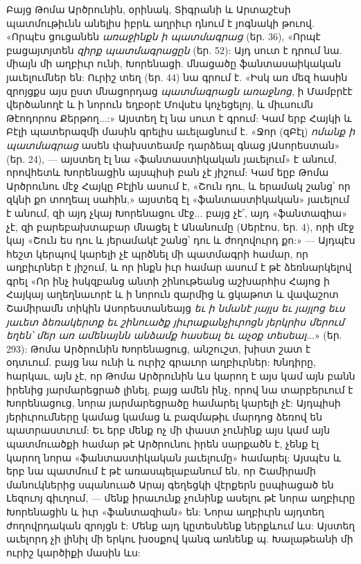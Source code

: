 \documentclass{article}
\begin{document}
{Բայց Թոմա Արծրունին, օրինակ, Տիգրանի և Արտաշէսի պատմութիւնն անելիս իբրև աղրիւր դնում է յոգնակի թուով. «Որպէս ցուցանեն \emph{առաջինքն ի պատմագրաց} (եր. 36), «Որպէ բացայտյտեն \emph{զիրք պատմագրացըն} (եր. 52): Այդ սուտ է դրում նա. միայն մի աղբիւր ունի, Խորենացի. մնացածը ֆանտասաիկական յաւելումներ են: Ուրիշ տեղ (եր. 44) նա գրում է. «Իսկ առ մեզ հասին զրոյցքս այս ըստ մնացորդաց \emph{պատմագրացն առաջնոց}, ի Մամբրէէ վերծանողէ և ի նորուն եղբօրէ Մովսէս կոչեցելոյ, և միւսումն Թէոդորոս Քերթող...:» Այստեղ էլ նա սուտ է գրում: Կամ երբ Հայկի և Բէլի պատերազմի մասին գրելիս աւելացնում է. «Ջոր (զԲէլ) \emph{ոմանք ի պատմագրաց} ասեն փախստեամբ դարձեալ գնաց յԱսորեստան» (եր. 24), — այստեղ էլ նա «ֆանտաստիկական յաւելում» է անում, որովհետև Խորենացին այսպիսի բան չէ յիշում: Կամ եըբ Թոմա Արծրունու մէջ Հայկը Բէլին ասում է, «Շուն դու, և երամակ շանց՝ որ զկնի քո տողեալ սահին,» այստեզ էլ «ֆանտաստիկական» յաւելում է անում, զի այդ չկայ Խորենացու մէջ... բայց չէ՛, այդ «ֆանտազիա» չէ, զի բարեբախտաբար մնացել է Անանումը (Սերէոս, եր. 4), որի մէջ կայ «Շուն ես դու և յերամակէ շանց՝ դու և ժողովուրդ քո:» — Այդպէս հեշտ կերպով կարելի չէ պրծնել մի պատմագրի համար, որ աղբիւրներ է յիշում, և որ ինքն իւր համար ասում է թէ ձեռնարկելով գրել «Որ ինչ իսկզբանց անտի շինութեանց աշխարհիս Հայոց ի Հայկայ աղեղնաւորէ և ի նորուն զարմից և ցկաթոտ և վավաշոտ Շամիրամն տիկին Ասորեստանեայց \emph{եւ ի նմանէ յայլս եւ յայլոց եւս յաւետ ձեռակերտք եւ շինուածք յիւրաքանչիւրոցն յերկրիս մերում եղեն՝ մեր առ ամենայնն անձամք հասեալ եւ աչօք տեսեալ}...» (եր. 293): Թոմա Արծրունին Խորենացուց, անշուշտ, խիստ շատ է օդտւում. բայց նա ունի և ուրիշ գրաւոր աղբիւրներ: Խնդիրը, հարկաւ, այն չէ, որ Թոմա Արծրունին ևս կարող է այս կամ այն բանն իրենից յարմարեցրած լինել, բայց ամեն ինչ, որով նա տարբերւում է Խորենացուց, նորա յարմարեցրածը համարել կարելի չէ: Այդպիսի յերիւրումները կամաց կամաց և բազմաթիւ մարդոց ձեռով են պատրաստւում: Եւ երբ մենք ոչ մի փաստ չունինք այս կամ այն պատմուածքի համար թէ Արծրունու իրեն սարքածն է, չենք էլ կարող նորա «ֆանտաստիկական յաւելումը» համարել: Այսպէս և երբ նա պատմում է թէ առասպելաբանում են, որ Շամիրամի մանուկներից սպանուած Արայ գեղեցկի վէրքերն ըսպիացած են Լեզուոյ գիւղում, — մենք իրաւունք չունինք ասելու թէ նորա աղբիւրը Խորենացին և իւր «ֆանտազիան» են: Նորա աղբիւրն այդտեղ ժողովրդական զրոյցն է: Մենք այդ կըտեսնենք ներքևում ևս: Այստեղ աւելորդ չի լինիլ մի երկու խօսքով կանգ առնենք պ. Խալաթեանի մի ուրիշ կարծիքի մասին ևս:

}
\end{document}
